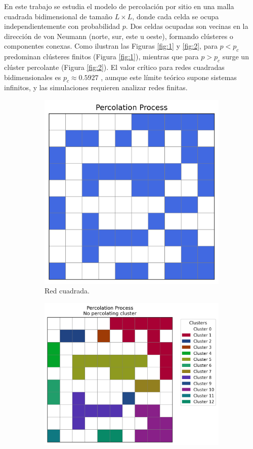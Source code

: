 \documentclass[12pt,a4paper]{article}
\begin{document}
En este trabajo se estudia el modelo de percolación por sitio en una malla cuadrada bidimensional de tamaño \( L \times L \), donde cada celda se ocupa independientemente con probabilidad \( p \). Dos celdas ocupadas son vecinas en la dirección de von Neumann (norte, sur, este u oeste), formando clústeres o componentes conexas. Como ilustran las Figuras \ref{fig:1} y \ref{fig:2}, para \( p < p_c \) predominan clústeres finitos (Figura \ref{fig:1}), mientras que para \( p > p_c \) surge un clúster percolante (Figura \ref{fig:2}). El valor crítico para redes cuadradas bidimensionales es \( p_c \approx 0.5927 \) \cite{PERCentralPercolation}, aunque este límite teórico supone sistemas infinitos, y las simulaciones requieren analizar redes finitas.

\begin{figure}[H]
    \centering
    \begin{subfigure}[h]{0.4\textwidth}
        \centering
        \includegraphics[width=0.75\linewidth]{../figures/percolation1.png}
        \caption{Red cuadrada.}
        \label{fig:subfig1}
    \end{subfigure}
    \hspace{0.02 cm}
    \begin{subfigure}[h]{0.45\textwidth}
        \centering
        \includegraphics[width=0.9\linewidth]{../figures/clusterpercolation1.png}

\end{subfigure}
\end{figure}
\end{document}
